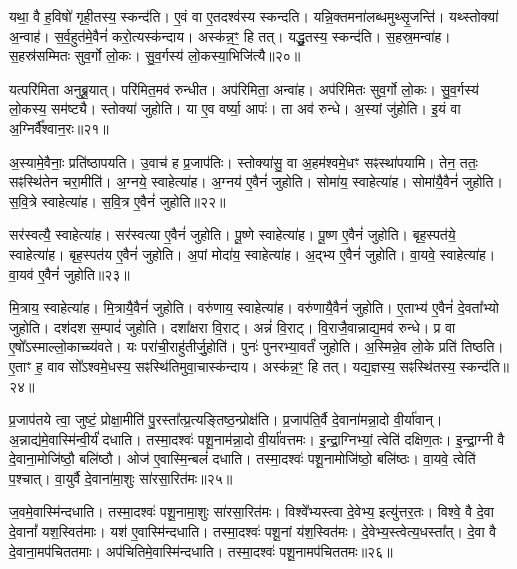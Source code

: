 यथा॒ वै ह॒विषो॑ गृही॒तस्य॒ स्कन्द॑ति।
ए॒वं वा ए॒तदश्व॑स्य स्कन्दति।
यन्नि॒क्तमना॑लब्धमुथ्सृ॒जन्ति॑।
यथ्स्तोक्या॑ अ॒न्वाह॑।
स॒र्व॒हुत॑मे॒वैनं॑ करो॒त्यस्क॑न्दाय।
अस्क॑न्न॒ꣳ॒ हि तत्।
यद्धु॒तस्य॒ स्कन्द॑ति।
स॒हस्र॒मन्वा॑ह।
स॒हस्र॑सम्मितः सुव॒र्गो लो॒कः।
सु॒व॒र्गस्य॑ लो॒कस्या॒भिजि॑त्यै॥२०॥

यत्परि॑मिता अनुब्रू॒यात्।
परि॑मित॒मव॑ रुन्धीत।
अप॑रिमिता॒ अन्वा॑ह।
अप॑रिमितः सुव॒र्गो लो॒कः।
सु॒व॒र्गस्य॑ लो॒कस्य॒ सम॑ष्ट्यै।
स्तोक्या॑ जुहोति।
या ए॒व वर्ष्या॒ आपः॑।
ता अव॑ रुन्धे।
अ॒स्यां जु॑होति।
इ॒यं वा अ॒ग्निर्वै᳚श्वान॒रः॥२१॥

अ॒स्यामे॒वैनाः॒ प्रति॑\-ष्ठापयति।
उ॒वाच॑ ह प्र॒जाप॑तिः।
स्तोक्या॑सु॒ वा अ॒हम॑श्वमे॒धꣳ सꣴस्था॑पयामि।
तेन॒ ततः॒ सꣴस्थि॑तेन चरा॒मीति॑।
अ॒ग्नये॒ स्वाहेत्या॑ह।
अ॒ग्नय॑ ए॒वैनं॑ जुहोति।
सोमा॑य॒ स्वाहेत्या॑ह।
सोमा॑यै॒वैनं॑ जुहोति।
स॒वि॒त्रे स्वाहेत्या॑ह।
स॒वि॒त्र ए॒वैनं॑ जुहोति॥२२॥

सर॑स्वत्यै॒ स्वाहेत्या॑ह।
सर॑स्वत्या ए॒वैनं॑ जुहोति।
पू॒ष्णे स्वाहेत्या॑ह।
पू॒ष्ण ए॒वैनं॑ जुहोति।
बृह॒स्पत॑ये॒ स्वाहेत्या॑ह।
बृह॒स्पत॑य ए॒वैनं॑ जुहोति।
अ॒पां मोदा॑य॒ स्वाहेत्या॑ह।
अ॒द्भ्य ए॒वैनं॑ जुहोति।
वा॒यवे॒ स्वाहेत्या॑ह।
वा॒यव॑ ए॒वैनं॑ जुहोति॥२३॥

मि॒त्राय॒ स्वाहेत्या॑ह।
मि॒त्रायै॒वैनं॑ जुहोति।
वरु॑णाय॒ स्वाहेत्या॑ह।
वरु॑णायै॒वैनं॑ जुहोति।
ए॒ताभ्य॑ ए॒वैनं॑ दे॒वता᳚भ्यो जुहोति।
दश॑दश स॒म्पादं॑ जुहोति।
दशा᳚क्षरा वि॒राट्।
अन्नं॑ वि॒राट्।
वि॒राजै॒वान्नाद्य॒मव॑ रुन्धे।
प्र वा ए॒षो᳚\-ऽस्माल्लो॒काच्च्य॑वते।
यः परा॑ची॒राहु॑तीर्जु॒होति॑।
पुनः॑ पुनरभ्या॒वर्तं॑ जुहोति।
अ॒स्मिन्ने॒व लो॒के प्रति॑ तिष्ठति।
ए॒ताꣳ ह॒ वाव सो᳚\-ऽश्वमे॒धस्य॒ सꣴस्थि॑तिमुवा॒चास्क॑न्दाय।
अस्क॑न्न॒ꣳ॒ हि तत्।
यद्य॒ज्ञस्य॒ सꣴस्थि॑तस्य॒ स्कन्द॑ति॥२४॥\anuvakamend[अ॒भिजि॑त्यै वैश्वान॒रः स॑वि॒त्र ए॒वैनं॑ जुहोति वा॒यव॑ ए॒वैनं॑ जुहोति च्यवते॒ षट् च॑]

प्र॒जाप॑तये त्वा॒ जुष्टं॒ प्रोक्षा॒मीति॑ पु॒रस्ता᳚त्प्र॒त्यङ्तिष्ठ॒न्प्रोक्ष॑ति।
प्र॒जाप॑ति॒र्वै दे॒वाना॑मन्ना॒दो वी॒र्या॑वान्।
अ॒न्नाद्य॑मे॒वास्मि॑न्वी॒र्यं॑ दधाति।
तस्मा॒दश्वः॑ पशू॒नाम॑न्ना॒दो वी॒र्या॑वत्तमः।
इ॒न्द्रा॒ग्निभ्यां॒ त्वेति॑ दक्षिण॒तः।
इ॒न्द्रा॒ग्नी वै दे॒वाना॒मोजि॑ष्ठौ॒ बलि॑ष्ठौ।
ओज॑ ए॒वास्मि॒न्बलं॑ दधाति।
तस्मा॒दश्वः॑ पशू॒नामोजि॑ष्ठो॒ बलि॑ष्ठः।
वा॒यवे॒ त्वेति॑ प॒श्चात्।
वा॒युर्वै दे॒वाना॑मा॒शुः सा॑रसा॒रित॑मः॥२५॥

ज॒वमे॒वास्मि॑न्दधाति।
तस्मा॒दश्वः॑ पशू॒नामा॒शुः सा॑रसा॒रित॑मः।
विश्वे᳚भ्यस्त्वा दे॒वेभ्य॒ इत्यु॑त्तर॒तः।
विश्वे॒ वै दे॒वा दे॒वानां᳚ यश॒स्वित॑माः।
यश॑ ए॒वास्मि॑न्दधाति।
तस्मा॒दश्वः॑ पशू॒नां य॑श॒स्वित॑मः।
दे॒वेभ्य॒स्त्वेत्य॒धस्ता᳚त्।
दे॒वा वै दे॒वाना॒मप॑चिततमाः।
अप॑चितिमे॒वास्मि॑न्दधाति।
तस्मा॒दश्वः॑ पशू॒नामप॑चिततमः॥२६॥


